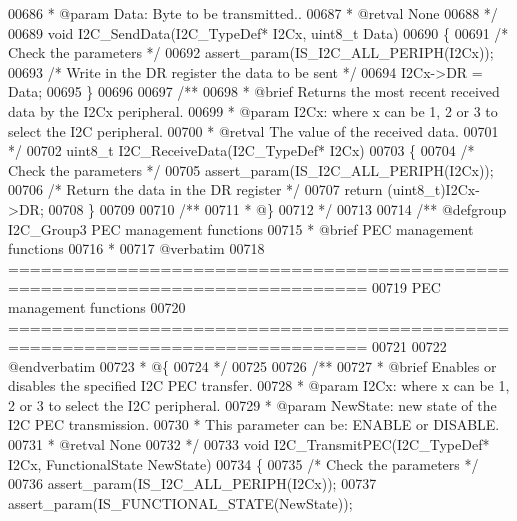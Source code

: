 \begin{DoxyCode}
00686 \textcolor{comment}{  * @param  Data: Byte to be transmitted..}
00687 \textcolor{comment}{  * @retval None}
00688 \textcolor{comment}{  */}
00689 \textcolor{keywordtype}{void} I2C_SendData(I2C\_TypeDef* I2Cx, uint8\_t Data)
00690 \{
00691   \textcolor{comment}{/* Check the parameters */}
00692   assert_param(IS\_I2C\_ALL\_PERIPH(I2Cx));
00693   \textcolor{comment}{/* Write in the DR register the data to be sent */}
00694   I2Cx->DR = Data;
00695 \}
00696 
00697 \textcolor{comment}{/**}
00698 \textcolor{comment}{  * @brief  Returns the most recent received data by the I2Cx peripheral.}
00699 \textcolor{comment}{  * @param  I2Cx: where x can be 1, 2 or 3 to select the I2C peripheral.}
00700 \textcolor{comment}{  * @retval The value of the received data.}
00701 \textcolor{comment}{  */}
00702 uint8\_t I2C_ReceiveData(I2C\_TypeDef* I2Cx)
00703 \{
00704   \textcolor{comment}{/* Check the parameters */}
00705   assert_param(IS\_I2C\_ALL\_PERIPH(I2Cx));
00706   \textcolor{comment}{/* Return the data in the DR register */}
00707   \textcolor{keywordflow}{return} (uint8\_t)I2Cx->DR;
00708 \}
00709 
00710 \textcolor{comment}{/**}
00711 \textcolor{comment}{  * @\}}
00712 \textcolor{comment}{  */}
00713 
00714 \textcolor{comment}{/** @defgroup I2C\_Group3 PEC management functions}
00715 \textcolor{comment}{ *  @brief   PEC management functions }
00716 \textcolor{comment}{ *}
00717 \textcolor{comment}{@verbatim   }
00718 \textcolor{comment}{ ===============================================================================}
00719 \textcolor{comment}{                         PEC management functions}
00720 \textcolor{comment}{ ===============================================================================  }
00721 \textcolor{comment}{}
00722 \textcolor{comment}{@endverbatim}
00723 \textcolor{comment}{  * @\{}
00724 \textcolor{comment}{  */}
00725 
00726 \textcolor{comment}{/**}
00727 \textcolor{comment}{  * @brief  Enables or disables the specified I2C PEC transfer.}
00728 \textcolor{comment}{  * @param  I2Cx: where x can be 1, 2 or 3 to select the I2C peripheral.}
00729 \textcolor{comment}{  * @param  NewState: new state of the I2C PEC transmission.}
00730 \textcolor{comment}{  *          This parameter can be: ENABLE or DISABLE.}
00731 \textcolor{comment}{  * @retval None}
00732 \textcolor{comment}{  */}
00733 \textcolor{keywordtype}{void} I2C_TransmitPEC(I2C\_TypeDef* I2Cx, FunctionalState NewState)
00734 \{
00735   \textcolor{comment}{/* Check the parameters */}
00736   assert_param(IS\_I2C\_ALL\_PERIPH(I2Cx));
00737   assert_param(IS\_FUNCTIONAL\_STATE(NewState));

\end{DoxyCode}
